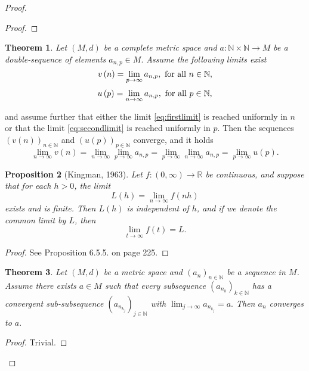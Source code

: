 \documentclass[12pt,a4paper]{scrartcl}
\newtheorem{theorem}{Theorem}[section]
\newtheorem{proposition}[theorem]{Proposition}
\numberwithin{equation}{section}
\newcommand{\R}{\mathbb{R}} %
\newcommand{\N}{\mathbb{N}} %
\begin{document}
\begin{proof}
\begin{proof}
\end{proof}

\begin{theorem} \label{th:exchangelimits}
Let $\left(M,d\right)$ be a complete metric space and $a: \N \times \N \to M$ be a double-sequence of elements $a_{n,p} \in M.$ Assume the following limits exist
\begin{equation}\label{eq:firstlimit}
v\left(n\right) = \lim_{p \to \infty} a_{n,p}, \textnormal{ for all } n \in \N,
\end{equation}
\begin{equation}\label{eq:secondlimit}
u\left(p\right) = \lim_{n \to \infty} a_{n,p}, \textnormal{ for all } p \in \N,
\end{equation}
\end{theorem}
and assume further that either the limit \eqref{eq:firstlimit} is reached uniformly in $n$ or that the limit \eqref{eq:secondlimit} is reached uniformly in $p.$ Then the sequences $\left(v\left(n\right)\right)_{n \in \N}$ and $\left(u\left(p\right)\right)_{p \in \N}$ converge, and it holds
$$\lim_{n \to \infty} v\left(n\right) = \lim_{n \to \infty} \lim_{p \to \infty} a_{n,p} = \lim_{p \to \infty} \lim_{n \to \infty} a_{n,p} = \lim_{p \to \infty} u\left(p\right). $$

\begin{proposition}[Kingman, 1963] \label{limitlemma}
Let $f:\left(0, \infty\right) \to \R$ be continuous, and suppose that for each $h > 0$, the limit
$$ L\left(h\right) = \lim_{n \to \infty} f\left(nh\right) $$
exists and is finite. Then $L\left(h\right)$ is independent of $h$, and if we denote the common limit by $L$, then
$$\lim_{t \to \infty} f\left(t\right) = L.$$  
\end{proposition}
\begin{proof}
See \cite{anderson} Proposition 6.5.5. on page 225.
\end{proof}

\begin{theorem} \label{subsubsubsequencelemma}
Let $\left(M,d\right)$ be a metric space and $\left(a_n\right)_{n \in \N}$ be a sequence in $M$. Assume there exists $a \in M$ such that every subsequence $\left(a_{n_k}\right)_{k \in \N}$ has a convergent sub-subsequence $\left(a_{n_{k_j}}\right)_{j \in \N}$ with $\lim_{j \to \infty} a_{n_{k_j}} = a.$ Then $a_n$ converges to $a.$
\end{theorem}
\begin{proof}
Trivial.
\end{proof}




\end{proof}
\end{document}
